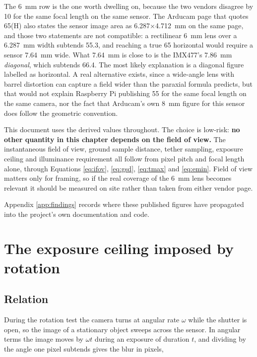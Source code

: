 The 6~mm row is the one worth dwelling on, because the two vendors disagree by 10\textdegree{} for the same focal length on the same sensor. The Arducam page that quotes 65\textdegree(H) also states the sensor image area as 6.287$\times$4.712~mm on the same page, and those two statements are not compatible: a rectilinear 6~mm lens over a 6.287~mm width subtends 55.3\textdegree, and reaching a true 65\textdegree{} horizontal would require a sensor 7.64~mm wide. What 7.64~mm is close to is the IMX477's 7.86~mm \emph{diagonal}, which subtends 66.4\textdegree. The most likely explanation is a diagonal figure labelled as horizontal. A real alternative exists, since a wide-angle lens with barrel distortion can capture a field wider than the paraxial formula predicts, but that would not explain Raspberry Pi publishing 55\textdegree{} for the same focal length on the same camera, nor the fact that Arducam's own 8~mm figure for this sensor does follow the geometric convention.

This document uses the derived values throughout. The choice is low-risk: \textbf{no other quantity in this chapter depends on the field of view.} The instantaneous field of view, ground sample distance, tether sampling, exposure ceiling and illuminance requirement all follow from pixel pitch and focal length alone, through Equations \ref{eq:ifov}, \ref{eq:gsd}, \ref{eq:tmax} and \ref{eq:emin}. Field of view matters only for framing, so if the real coverage of the 6~mm lens becomes relevant it should be measured on site rather than taken from either vendor page.

Appendix \ref{app:findings} records where these published figures have propagated into the project's own documentation and code.

\section{The exposure ceiling imposed by rotation}

\subsection{Relation}

During the rotation test the camera turns at angular rate $\omega$ while the shutter is open, so the image of a stationary object sweeps across the sensor. In angular terms the image moves by $\omega t$ during an exposure of duration $t$, and dividing by the angle one pixel subtends gives the blur in pixels,

